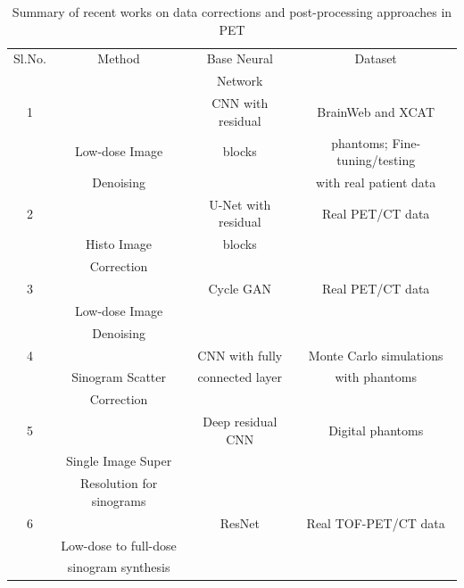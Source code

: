 \begin{table}[ht!]
	\centering
	\caption{Summary of recent works on data corrections and post-processing approaches in \ac{PET}}
	\label{table:pp_PET}
	\scriptsize
	\begin{tabular}{||c|c|c|c||} 
		\hline
		Sl.No.    & Method             & Base Neural  & Dataset        \\ %
		          &                    &  Network     &                \\
		\hline\hline
		1         & \cite{gong2018pet} & \ac{CNN} with residual & BrainWeb and XCAT  \\     
		          &  Low-dose Image    &  blocks                & phantoms; Fine-tuning/testing  \\ 
		          &   Denoising        & & with real patient data       \\ 
		\hline
		2         &  \cite{whiteley2020fastpet}& U-Net with residual & Real PET/CT data \\
		          & Histo Image        & blocks      &        \\
		          & Correction         &                &        \\
		\hline  
		3         & \cite{zhao2020study}& Cycle GAN    & Real PET/CT data  \\ 
       	          & Low-dose Image      &              &                   \\ 
       	          & Denoising           &              &                   \\ 
       	\hline
       	4         & \cite{qian2017deep} & CNN with fully    & Monte Carlo simulations  \\ 
                  & Sinogram Scatter    & connected layer   & with phantoms            \\ 
       	          & Correction          &                   &                          \\ 
       	\hline
       	5         & \cite{hong2018enhancing}& Deep residual CNN & Digital phantoms  \\ 
       	          & Single Image Super      &                   &             \\ 
       	          & Resolution for sinograms&                   &                          \\ 
       	\hline
       	6         & \cite{sanaat2021deeptofsino}&   ResNet       & Real TOF-PET/CT data  \\ 
       	          & Low-dose to full-dose    &                   &             \\ 
       	          & sinogram synthesis    &                      &                          \\ 
       	\hline
       	
	\end{tabular}
	
\end{table}

